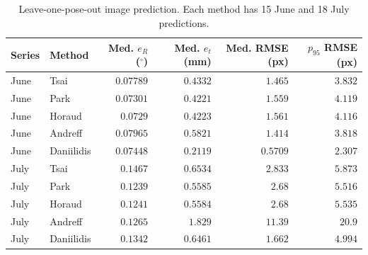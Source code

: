 \begin{table}[!htbp]\centering\footnotesize\setlength{\tabcolsep}{4pt}
\caption{Leave-one-pose-out image prediction. Each method has 15 June and 18 July predictions.}\label{tab:real}
\begin{tabular}{llrrrr}
\toprule
Series & Method & Med. $e_R$ ($^\circ$) & Med. $e_t$ (mm) & Med. RMSE (px) & $p_{95}$ RMSE (px) \\
\midrule
June & Tsai & $0.07789$ & $0.4332$ & $1.465$ & $3.832$ \\
June & Park & $0.07301$ & $0.4221$ & $1.559$ & $4.119$ \\
June & Horaud & $0.0729$ & $0.4223$ & $1.561$ & $4.116$ \\
June & Andreff & $0.07965$ & $0.5821$ & $1.414$ & $3.818$ \\
June & Daniilidis & $0.07448$ & $0.2119$ & $0.5709$ & $2.307$ \\
July & Tsai & $0.1467$ & $0.6534$ & $2.833$ & $5.873$ \\
July & Park & $0.1239$ & $0.5585$ & $2.68$ & $5.516$ \\
July & Horaud & $0.1241$ & $0.5584$ & $2.68$ & $5.535$ \\
July & Andreff & $0.1265$ & $1.829$ & $11.39$ & $20.9$ \\
July & Daniilidis & $0.1342$ & $0.6461$ & $1.662$ & $4.994$ \\
\bottomrule
\end{tabular}
\end{table}
